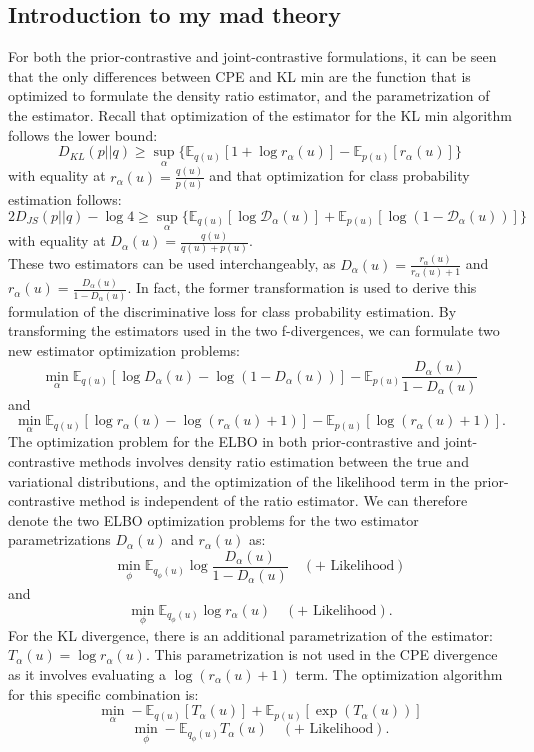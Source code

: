 \documentclass[a4paper,12pt]{article}
\numberwithin{equation}{section}
\begin{document}
\subsection{Introduction to my mad theory}
For both the prior-contrastive and joint-contrastive formulations, it can be seen that the only differences between CPE and KL min are the function that is optimized to formulate the density ratio estimator, and the parametrization of the estimator. Recall that optimization of the estimator for the KL min algorithm follows the lower bound:
\[D_{KL}(p||q)\geq \sup_{\alpha}\{\mathbb{E}_{q(u)}[1+\log r_\alpha(u)]-\mathbb{E}_{p(u)}[r_\alpha(u)]\}\]
with equality at $r_\alpha(u)=\frac{q(u)}{p(u)}$ and that optimization for class probability estimation follows:
\[2D_{JS}(p||q)-\log 4\geq \sup_\alpha\{\mathbb{E}_{q(u)}[\log \mathcal{D}_\alpha(u)]+\mathbb{E}_{p(u)}[\log(1-\mathcal{D}_\alpha(u))]\}\]
with equality at $D_\alpha(u)=\frac{q(u)}{q(u)+p(u)}$.\\
These two estimators can be used interchangeably, as $D_\alpha(u)=\frac{r_\alpha(u)}{r_\alpha(u)+1}$ and $r_\alpha(u)=\frac{D_\alpha(u)}{1-D_\alpha(u)}$. In fact, the former transformation is used to derive this formulation of the discriminative loss for class probability estimation. By transforming the estimators used in the two f-divergences, we can formulate two new estimator optimization problems:
\[\min_\alpha \mathbb{E}_{q(u)}[\log D_\alpha (u)-\log(1-D_\alpha(u))]-\mathbb{E}_{p(u)}\frac{D_\alpha(u)}{1-D_\alpha(u)}\]
and
\[\min_\alpha \mathbb{E}_{q(u)}[\log r_\alpha(u)-\log (r_\alpha(u)+1)]-\mathbb{E}_{p(u)}[\log(r_\alpha(u)+1)].\]
The optimization problem for the ELBO in both prior-contrastive and joint-contrastive methods involves density ratio estimation between the true and variational distributions, and the optimization of the likelihood term in the prior-contrastive method is independent of the ratio estimator. We can therefore denote the two ELBO optimization problems for the two estimator parametrizations $D_\alpha (u)$ and $r_\alpha(u)$ as:
\[\min_\phi \mathbb{E}_{q_\phi(u)}\log \frac{D_\alpha (u)}{1-D_\alpha (u)}\quad(+\text{ Likelihood})\]
and
\[\min_\phi \mathbb{E}_{q_\phi(u)}\log r_\alpha (u)\quad(+\text{ Likelihood}).\]
For the KL divergence, there is an additional parametrization of the estimator: $T_\alpha(u)=\log r_\alpha(u)$. This parametrization is not used in the CPE divergence as it involves evaluating a $\log (r_\alpha(u)+1)$ term. The optimization algorithm for this specific combination is:
\[\min_\alpha -\mathbb{E}_{q(u)}[T_\alpha(u)]+\mathbb{E}_{p(u)}[\exp(T_\alpha (u))]\]
\[\min_\phi -\mathbb{E}_{q_\phi(u)}T_\alpha(u)\quad(+\text{ Likelihood}).\]
\end{document}
